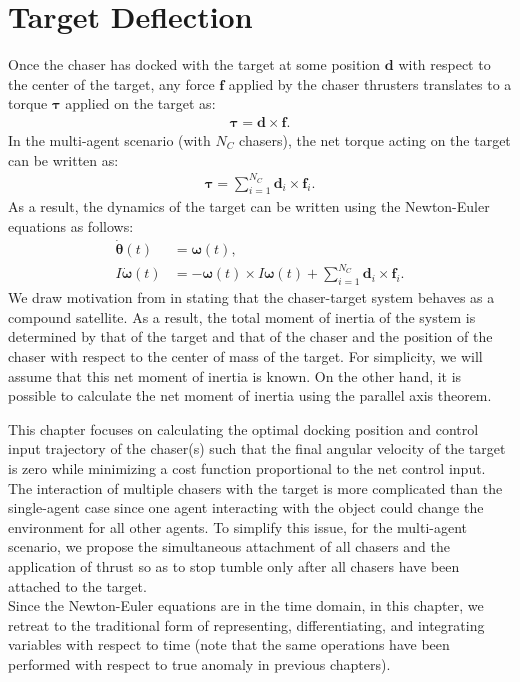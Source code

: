 \chapter{Target Deflection}
\label{sec:target-deflection}
Once the chaser has docked with the target at some position $\boldsymbol{d}$ with respect to the center of the target, any force $\boldsymbol{f}$ applied by the chaser thrusters translates to a torque $\boldsymbol{\tau}$ applied on the target as:
\begin{align}
    \boldsymbol{\tau} = \boldsymbol{d}\times\boldsymbol{f}.
\end{align}
In the multi-agent scenario (with $N_C$ chasers), the net torque acting on the target can be written as:
\begin{align}
    \boldsymbol{\tau} = \sum_{i=1}^{N_C}\boldsymbol{d}_{i}\times\boldsymbol{f}_{i}.
\end{align}
As a result, the dynamics of the target can be written using the Newton-Euler equations as follows:
\begin{align}
    \dot{\boldsymbol{\theta}}(t)&=\boldsymbol{\omega}(t),\\
    I\dot{\boldsymbol{\omega}}(t)&=-\boldsymbol{\omega}(t)\times I\boldsymbol{\omega}(t)+\sum_{i=1}^{N_C}\boldsymbol{d}_{i}\times\boldsymbol{f}_{i}.
\label{eqn:newton-euler-target-detumbling}
\end{align}
We draw motivation from \cite{liu2014in} in stating that the chaser-target system behaves as a compound satellite.
As a result, the total moment of inertia of the system is determined by that of the target and that of the chaser and the position of the chaser with respect to the center of mass of the target.
For simplicity, we will assume that this net moment of inertia is known.
On the other hand, it is possible to calculate the net moment of inertia using the parallel axis theorem.

This chapter focuses on calculating the optimal docking position and control input trajectory of the chaser(s) such that the final angular velocity of the target is zero while minimizing a cost function proportional to the net control input.
The interaction of multiple chasers with the target is more complicated than the single-agent case since one agent interacting with the object could change the environment for all other agents.
To simplify this issue, for the multi-agent scenario, we propose the simultaneous attachment of all chasers and the application of thrust so as to stop tumble only after all chasers have been attached to the target.\\
Since the Newton-Euler equations are in the time domain, in this chapter, we retreat to the traditional form of representing, differentiating, and integrating variables with respect to time (note that the same operations have been performed with respect to true anomaly in previous chapters).


